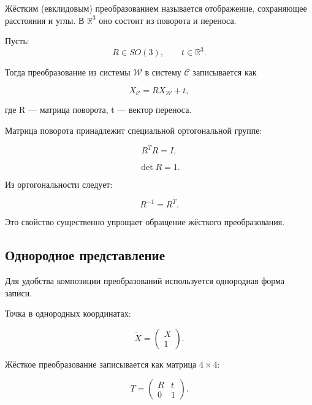 \documentclass[a4paper,12pt]{article}
\begin{document}
Жёстким (евклидовым) преобразованием называется отображение, сохраняющее расстояния и углы. В $\mathbb{R}^3$ оно состоит из поворота и переноса.

Пусть:
\[
R \in SO(3), \qquad t \in \mathbb{R}^3.
\]

Тогда преобразование из системы $\mathcal{W}$ в систему $\mathcal{C}$ записывается как

\begin{equation}
X_{\mathcal{C}} = R X_{\mathcal{W}} + t,
\end{equation}

где R --- матрица поворота, t --- вектор переноса.

\bigskip

Матрица поворота принадлежит специальной ортогональной группе:

\begin{equation}
R^T R = I,
\end{equation}

\begin{equation}
\det R = 1.
\end{equation}

Из ортогональности следует:

\begin{equation}
R^{-1} = R^T.
\end{equation}

Это свойство существенно упрощает обращение жёсткого преобразования.

\subsection*{Однородное представление}

Для удобства композиции преобразований используется однородная форма записи.

Точка в однородных координатах:

\begin{equation}
\tilde{X} =
\begin{pmatrix}
X \\
1
\end{pmatrix}.
\end{equation}

Жёсткое преобразование записывается как матрица $4 \times 4$:

\begin{equation}
T =
\begin{pmatrix}
R & t \\
0 & 1
\end{pmatrix}.
\end{equation}
\end{document}
